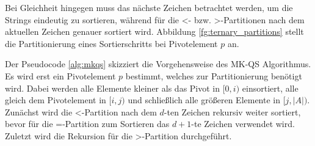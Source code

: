 Bei Gleichheit hingegen muss das nächste Zeichen betrachtet werden, um die Strings eindeutig zu sortieren, während für die \glqq <\grqq- bzw. \glqq >\grqq-Partitionen nach dem aktuellen Zeichen genauer sortiert wird. Abbildung \ref{fg:ternary_partitions} stellt die Partitionierung eines Sortierschritts bei Pivotelement $p$ an.

Der Pseudocode \ref{alg:mkqs} skizziert die Vorgehensweise des MK-QS Algorithmus. Es wird erst ein Pivotelement $p$ bestimmt, welches zur Partitionierung benötigt wird. Dabei werden alle Elemente kleiner als das Pivot in $[0, i)$ einsortiert, alle gleich dem Pivotelement in $[i, j)$ und schließlich alle größeren Elemente in $[j, |A|)$.
Zunächst wird die \glqq <\grqq-Partition nach dem $d$-ten Zeichen rekursiv weiter sortiert, bevor für die \glqq =\grqq-Partition zum Sortieren das $d+1$-te Zeichen verwendet wird. Zuletzt wird die Rekursion für die \glqq >\grqq-Partition durchgeführt.

